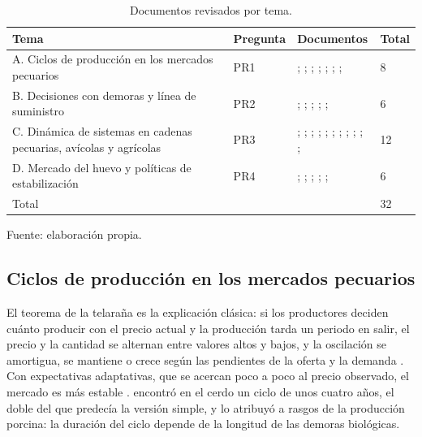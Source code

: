 \documentclass[preprint,12pt,authoryear]{elsarticle}
\begin{document}
\begin{table}[!htbp]
\centering
\caption{Documentos revisados por tema.}
\label{tab:corpus}
\footnotesize
\setlength{\tabcolsep}{4pt}
\begin{tabularx}{\textwidth}{@{}P{3.3cm}C{1.2cm}LC{0.8cm}@{}}
\toprule
Tema & Pregunta & Documentos & Total \\
\midrule
A. Ciclos de producción en los mercados pecuarios & PR1 & \citet{Ezekiel1938}; \citet{Nerlove1958}; \citet{Harlow1960}; \citet{Meadows1969}; \citet{Fisher1974}; \citet{Rosen1994}; \citet{Chavas1999}; \citet{BergHuffaker2015} & 8 \\
\addlinespace
B. Decisiones con demoras y línea de suministro & PR2 & \citet{Sterman1989a}; \citet{Sterman1989b}; \citet{Kampmann1992}; \citet{CrosonDonohue2006}; \citet{ArangoMoxnes2012}; \citet{KampmannSterman2014} & 6 \\
\addlinespace
C. Dinámica de sistemas en cadenas pecuarias, avícolas y agrícolas & PR3 & \citet{MinegishiThiel2000}; \citet{VoThiel2011}; \citet{Shamsuddoha2014}; \citet{Dizyee2017}; \citet{Lu2020}; \citet{RubianoIbarraVega2021}; \citet{Atzori2023}; \citet{AnaconaMopan2023}; \citet{ParraOrtega2025}; \citet{Saepullah2025}; \citet{Yuzaria2025}; \citet{Haryana2026} & 12 \\
\addlinespace
D. Mercado del huevo y políticas de estabilización & PR4 & \citet{EcheverrySilva2009}; \citet{Cardwell2015}; \citet{AlonsoCifuentes2017}; \citet{RodriguezTorres2020}; \citet{TraoreDoyon2023}; \citet{Mitchell2024} & 6 \\
\midrule
Total & & & 32 \\
\bottomrule
\end{tabularx}

\smallskip
{\footnotesize\raggedright Fuente: elaboración propia.\par}
\end{table}

\subsection{Ciclos de producción en los mercados pecuarios}
\label{sec2.2}

El teorema de la telaraña es la explicación clásica: si los productores deciden cuánto producir con el precio actual y la producción tarda un periodo en salir, el precio y la cantidad se alternan entre valores altos y bajos, y la oscilación se amortigua, se mantiene o crece según las pendientes de la oferta y la demanda \citep{Ezekiel1938}. Con expectativas adaptativas, que se acercan poco a poco al precio observado, el mercado es más estable \citep{Nerlove1958}. \citet{Harlow1960} encontró en el cerdo un ciclo de unos cuatro años, el doble del que predecía la versión simple, y lo atribuyó a rasgos de la producción porcina: la duración del ciclo depende de la longitud de las demoras biológicas.
\end{document}
